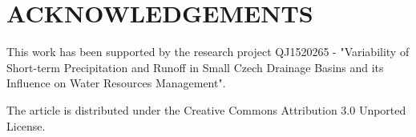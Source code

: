 \documentclass{isprs}
\begin{document}
{%
  \begin{spacing}{0.9}%
     
  \end{spacing}
}

\section*{ACKNOWLEDGEMENTS}\label{ACKNOWLEDGEMENTS}

This work has been supported by the research project QJ1520265 -
"Variability of Short-term Precipitation and Runoff in Small Czech
Drainage Basins and its Influence on Water Resources Management".

The article is distributed under the Creative Commons Attribution 3.0
Unported License.
\end{document}
